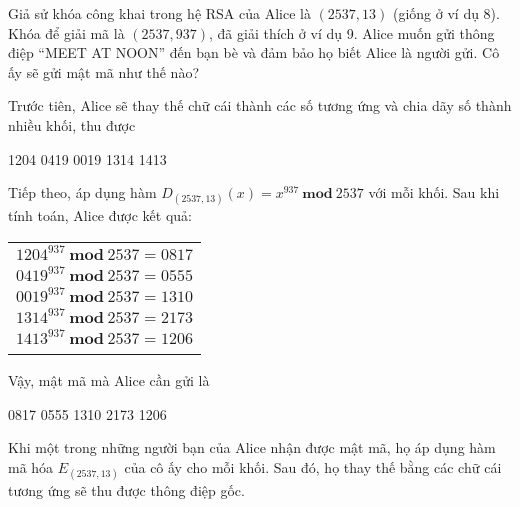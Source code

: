 \begin{example}
    Giả sử khóa công khai trong hệ RSA của Alice là $(2537,13)$ (giống ở ví dụ 8). Khóa để giải mã là $(2537, 937)$, đã giải thích ở ví dụ 9.
    Alice muốn gửi thông điệp ``MEET AT NOON'' đến bạn bè và đảm bảo họ biết Alice là người gửi.
    Cô ấy sẽ gửi mật mã như thế nào?
\end{example}
\begin{solution}
    Trước tiên, Alice sẽ thay thế chữ cái thành các số tương ứng và chia dãy số thành nhiều khối, thu được
    \begin{center}
        1204 \hspace{0.5cm} 0419 \hspace{0.5cm} 0019 \hspace{0.5cm} 1314 \hspace{0.5cm} 1413
    \end{center}
    Tiếp theo, áp dụng hàm $D_{(2537,13)}(x) = x^{937}\ \mathbf{mod}\ 2537$ với mỗi khối.
    Sau khi tính toán, Alice được kết quả: \\

    \begin{tabular}{c}
        $1204^{937}\ \mathbf{mod}\ 2537 = 0817$ \\
        $0419^{937}\ \mathbf{mod}\ 2537 = 0555$ \\
        $0019^{937}\ \mathbf{mod}\ 2537 = 1310$ \\
        $1314^{937}\ \mathbf{mod}\ 2537 = 2173$ \\
        $1413^{937}\ \mathbf{mod}\ 2537 = 1206$ \\
        \\
    \end{tabular}

    Vậy, mật mã mà Alice cần gửi là
    \begin{center}
        0817 \hspace{0.5cm} 0555 \hspace{0.5cm} 1310 \hspace{0.5cm} 2173 \hspace{0.5cm} 1206
    \end{center}
    Khi một trong những người bạn của Alice nhận được mật mã, họ áp
    dụng hàm mã hóa $E_{(2537,13)}$ của cô ấy cho mỗi khối. Sau đó, họ
    thay thế bằng các chữ cái tương ứng sẽ thu được thông điệp gốc.
\end{solution}

